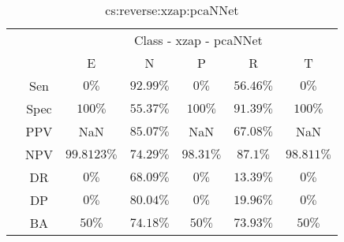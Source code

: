 \begin{table}[!ht]
	\centering
	\begin{tabular}{|c|c|c|c|c|c|c|}
		\cline{3-7}
		\multicolumn{2}{c|}{} & \multicolumn{5}{c|}{Class - xzap - pcaNNet} \\ \cline{3-7}
		\multicolumn{2}{c|}{} & E & N & P & R & T \\ \hline
		\multirow{7}{*}{\rotatebox{90}{Statistics}} & Sen & $0\%$ & $92.99\%$ & $0\%$ & $56.46\%$ & $0\%$ \\ \cline{2-7}
		 & Spec & $100\%$ & $55.37\%$ & $100\%$ & $91.39\%$ & $100\%$ \\ \cline{2-7}
		 & PPV & NaN & $85.07\%$ & NaN & $67.08\%$ & NaN \\ \cline{2-7}
		 & NPV & $99.8123\%$ & $74.29\%$ & $98.31\%$ & $87.1\%$ & $98.811\%$ \\ \cline{2-7}
		 & DR & $0\%$ & $68.09\%$ & $0\%$ & $13.39\%$ & $0\%$ \\ \cline{2-7}
		 & DP & $0\%$ & $80.04\%$ & $0\%$ & $19.96\%$ & $0\%$ \\ \cline{2-7}
		 & BA & $50\%$ & $74.18\%$ & $50\%$ & $73.93\%$ & $50\%$ \\ \hline
	\end{tabular}
	\caption{cs:reverse:xzap:pcaNNet}
	\label{tab:cs:reverse:xzap:pcaNNet}
\end{table}
